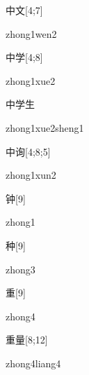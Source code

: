 \begin{verbete}{中文}[4;7]
\begin{pronuncia}{zhong1wen2}
\end{pronuncia}
\end{verbete}

\begin{verbete}{中学}[4;8]
\begin{pronuncia}{zhong1xue2}
\end{pronuncia}
\end{verbete}

\begin{verbete}{中学生}
\begin{pronuncia}{zhong1xue2sheng1}
\end{pronuncia}
\end{verbete}

\begin{verbete}{中询}[4;8;5]
\begin{pronuncia}{zhong1xun2}
\end{pronuncia}
\end{verbete}

\begin{verbete}[zhong1]{钟}[9]
\begin{pronuncia}{zhong1}
\end{pronuncia}
\end{verbete}

\begin{verbete}[zhong3]{种}[9]
\begin{pronuncia}{zhong3}
\end{pronuncia}
\end{verbete}

\begin{verbete}[zhong4]{重}[9]
\begin{pronuncia}{zhong4}
\end{pronuncia}
\end{verbete}

\begin{verbete}{重量}[8;12]
\begin{pronuncia}{zhong4liang4}
\end{pronuncia}
\end{verbete}

